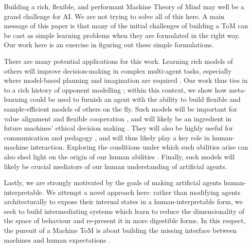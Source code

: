 \documentclass{article}
\begin{document}
Building a rich, flexible, and performant Machine Theory of Mind may well be a grand challenge for AI. We are not trying to solve all of this here. A main message of this paper is that many of the initial challenges of building a ToM can be cast as simple learning problems when they are formulated in the right way. Our work here is an exercise in figuring out these simple formulations.

There are many potential applications for this work. Learning rich models of others will improve decision-making in complex multi-agent tasks, especially where model-based planning and imagination are required \cite{hassabis2013imagine, hula2015monte, oliehoek2016concise}. Our work thus ties in to a rich history of opponent modelling \cite{brown1951iterative, albrecht2017autonomous}; within this context, we show how meta-learning could be used to furnish an agent with the ability to build flexible and sample-efficient models of others on the fly. Such models will be important for value alignment \cite{hadfield2016cooperative} and flexible cooperation \cite{nowak2006five, kleiman2016coordinate, barrett2017making, cao2018emergent}, and will likely be an ingredient in future machines' ethical decision making \cite{churchland1996neural}. They will also be highly useful for communication and pedagogy \cite{dragan2013legibility, fisac2017pragmatic, milli2017should}, and will thus likely play a key role in human-machine interaction. Exploring the conditions under which such abilities arise can also shed light on the origin of our human abilities \cite{carey2009origin}. Finally, such models will likely be crucial mediators of our human understanding of artificial agents.


Lastly, we are strongly motivated by the goals of making artificial agents human-interpretable. We attempt a novel approach here: rather than modifying agents architecturally to expose their internal states in a human-interpretable form, we seek to build intermediating systems which learn to reduce the dimensionality of the space of behaviour and re-present it in more digestible forms. In this respect, the pursuit of a Machine ToM is about building the missing interface between machines and human expectations \cite{cohen1981beyond}.
\end{document}
